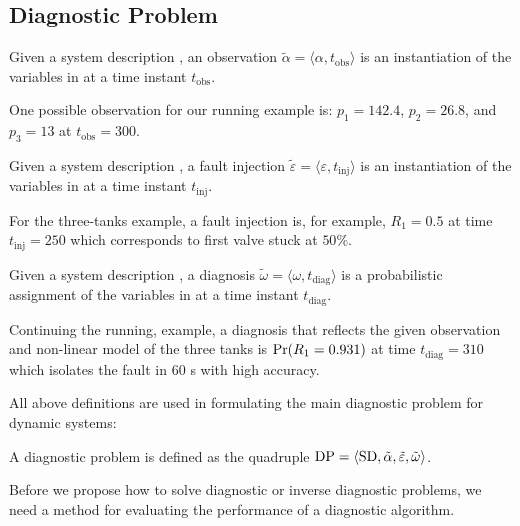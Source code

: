 \subsection{Diagnostic Problem}
%
\begin{definition}[Observation]
%
Given a system description \sd, an observation $\tilde\alpha =
\langle\alpha, t_{\mathrm{obs}}\rangle$ is an instantiation of the
variables in \obs at a time instant $t_{\mathrm{obs}}$.
%
\end{definition}
%
One possible observation for our running example is:
$p_1 = 142.4$, $p_2 = 26.8$, and $p_3 = 13$ at $t_{\mathrm{obs}} =
300$.
%
\begin{definition}
%
Given a system description \sd, a fault injection $\tilde{\varepsilon}
= \langle\varepsilon, t_{\mathrm{inj}}\rangle$ is an instantiation of
the variables in \comps at a time instant $t_{\mathrm{inj}}$.
%
\end{definition}
%
For the three-tanks example, a fault injection is, for example, $R_1 =
0.5$ at time $t_{\mathrm{inj}} = 250$ which corresponds to first valve
stuck at $50\%$.
%
\begin{definition}[Diagnosis]\label{def:diagnosis}
%
Given a system description \sd, a diagnosis $\tilde{\omega} =
\langle\omega, t_{\mathrm{diag}}\rangle$ is a probabilistic assignment
of the variables in \comps at a time instant $t_{\mathrm{diag}}$.
%
\end{definition}
%
Continuing the running, example, a diagnosis that reflects the given
observation and non-linear model of the three tanks is $\mathrm{Pr}(R_1 =
0.931)$ at time $t_{\mathrm{diag}} = 310$ which isolates the fault in
$60$ s with high accuracy.
\par
All above definitions are used in formulating the main diagnostic
problem for dynamic systems:
%
\begin{definition}
%
A diagnostic problem \dproblem is defined as the quadruple $\mathrm{DP}
= \langle\mathrm{SD}, \tilde{\alpha}, \tilde{\varepsilon},
\tilde{\omega}\rangle$.
%
\end{definition}
%
Before we propose how to solve diagnostic or inverse diagnostic
problems, we need a method for evaluating the performance of a
diagnostic algorithm.
%
